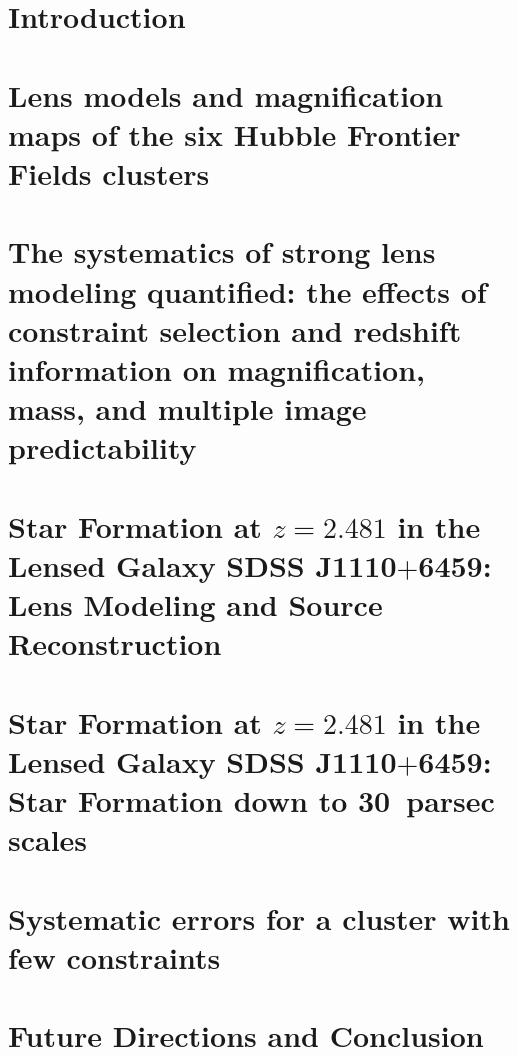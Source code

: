 \documentclass[reqno,12pt,oneside]{report} %
\theoremstyle{plain}
\theoremstyle{definition}
\theoremstyle{remark}
\numberwithin{theorem}{chapter}     %
\begin{document}
 \chapter{Introduction}
 \label{chap:Intro}
 

\chapter{Lens models and magnification maps of the six Hubble Frontier Fields clusters}
\label{chap:hff_clusters}

 
\chapter{The systematics of strong lens modeling quantified: the effects of constraint selection and redshift information on magnification, mass, and multiple image predictability}
\label{chap:ares_systematics}


\chapter{Star Formation at $z=2.481$ in the Lensed Galaxy SDSS J1110$+$6459: Lens Modeling and Source Reconstruction}
\label{chap:s1110}


\chapter{Star Formation at $z=2.481$ in the Lensed Galaxy SDSS J1110$+$6459: Star Formation down to 30~parsec scales}
\label{chap:clumps}


\chapter{Systematic errors for a cluster with few constraints}
\label{chap:sim}


\chapter{Future Directions and Conclusion}
\label{chap:future}


\startappendices
 \label{app:hff_spectroscopy}
 

 \label{app:hff_constraints}
 
\end{document}
